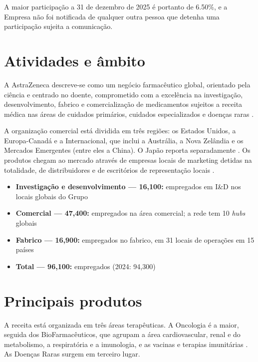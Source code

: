 A maior participação a 31 de dezembro de 2025 é portanto de 6.50\%, e a Empresa não foi notificada de qualquer outra pessoa que detenha uma participação sujeita a comunicação.

\section{Atividades e âmbito}

A AstraZeneca descreve-se como um negócio farmacêutico global, orientado pela ciência e centrado no doente, comprometido com a excelência na investigação, desenvolvimento, fabrico e comercialização de medicamentos sujeitos a receita médica nas áreas de cuidados primários, cuidados especializados e doenças raras \cite[p.~8]{AR}.

A organização comercial está dividida em três regiões: os Estados Unidos, a Europa-Canadá e a Internacional, que inclui a Austrália, a Nova Zelândia e os Mercados Emergentes (entre eles a China). O Japão reporta separadamente \cite[p.~32]{AR}. Os produtos chegam ao mercado através de empresas locais de marketing detidas na totalidade, de distribuidores e de escritórios de representação locais \cite[p.~32]{AR}.

\begin{itemize}[leftmargin=*]
\item \textbf{Investigação e desenvolvimento --- 16,100:} empregados em I\&D nos locais globais do Grupo \cite[p.~27]{AR}
\item \textbf{Comercial --- 47,400:} empregados na área comercial; a rede tem 10 \textit{hubs} globais \cite[p.~27]{AR}
\item \textbf{Fabrico --- 16,900:} empregados no fabrico, em 31 locais de operações em 15 países \cite[p.~27]{AR}
\item \textbf{Total --- 96,100:} empregados (2024: 94,300) \cite[p.~27]{AR}
\end{itemize}

\section{Principais produtos}

A receita está organizada em três áreas terapêuticas. A Oncologia é a maior, seguida dos BioFarmacêuticos, que agrupam a área cardiovascular, renal e do metabolismo, a respiratória e a imunologia, e as vacinas e terapias imunitárias \cite[pp.~2, 4]{AR}. As Doenças Raras surgem em terceiro lugar.

